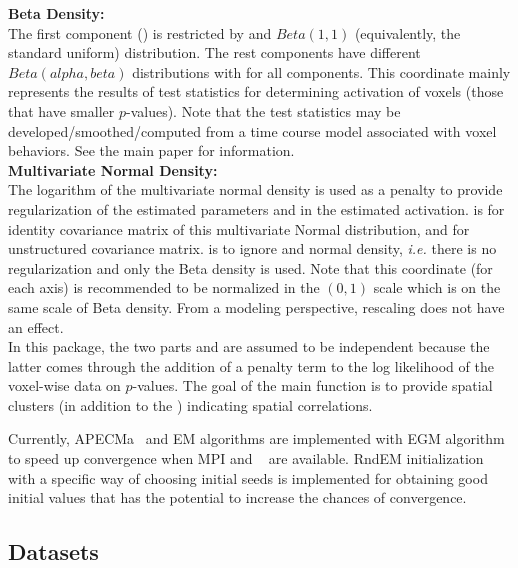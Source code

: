 {\bf Beta Density:}\\
The first component ()
is restricted by  and $Beta(1, 1)$ (equivalently,
the standard uniform) distribution. The rest  components have different 
$Beta(alpha, beta)$ distributions with  for all
 components.
This coordinate mainly represents the results of test statistics
for determining activation of voxels (those that have smaller $p$-values).
Note that the test statistics may be developed/smoothed/computed
from a time course model associated with voxel behaviors.
See the main paper \citet{ChenMaitra2018} for information.
\\

{\bf Multivariate Normal Density:}\\
The logarithm of the multivariate normal density is used as a penalty
to provide regularization of the estimated parameters and in the
estimated activation. 
 is for identity covariance matrix of this
multivariate Normal 
distribution, and  for unstructured covariance matrix.
 is to ignore  and normal density,
{\em i.e.} there is no regularization and only the Beta density is used.
Note that this coordinate (for each axis) is recommended to be
normalized in the $(0, 1)$ scale which is on the same scale of Beta
density. From a modeling perspective, rescaling  does not
have an effect. 
\\

In this package, the two parts  and  are
assumed to be independent because the latter comes through the
addition of a penalty term to the log likelihood of the voxel-wise data on
$p$-values. %
The goal of the main function is to provide spatial
clusters (in addition to the ) indicating spatial correlations.

Currently, APECMa~\citep{Chen2011}
and EM algorithms are implemented with EGM algorithm~\citep{Chen2013}
to speed up convergence when MPI and ~\citep{Chen2012}
are available.
RndEM initialization~\citep{Maitra2009} with a specific way of choosing
initial seeds is implemented for obtaining
good initial values that has the potential to increase the chances of
convergence. 


\subsection[Datasets]{Datasets}

